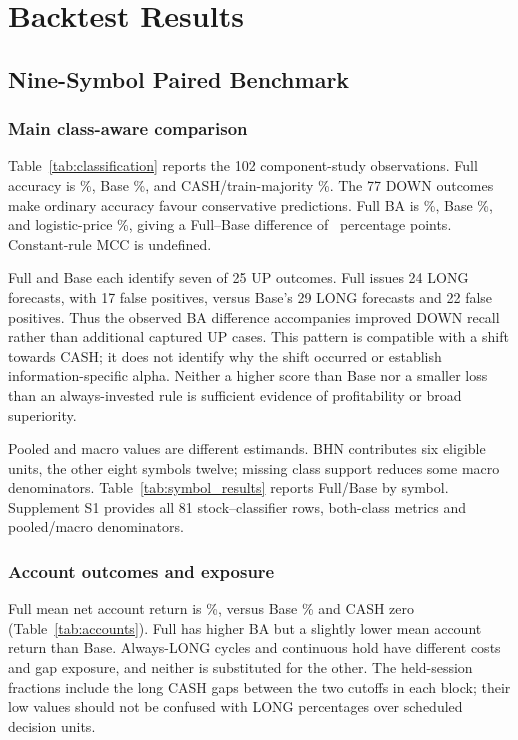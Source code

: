 \section{Backtest Results}
\label{sec:backtestresults}

\subsection{Nine-Symbol Paired Benchmark}
\subsubsection{Main class-aware comparison}
Table~\ref{tab:classification} reports the 102 component-study observations. Full accuracy is \FullAccuracy\%, Base \BaseAccuracy\%, and CASH/train-majority \CashAccuracy\%. The 77 DOWN outcomes make ordinary accuracy favour conservative predictions. Full BA is \FullBA\%, Base \BaseBA\%, and logistic-price \LogisticPriceBA\%, giving a Full--Base difference of \DeltaBA\ percentage points. Constant-rule MCC is undefined.

Full and Base each identify seven of 25 UP outcomes. Full issues 24 LONG forecasts, with 17 false positives, versus Base's 29 LONG forecasts and 22 false positives. Thus the observed BA difference accompanies improved DOWN recall rather than additional captured UP cases. This pattern is compatible with a shift towards CASH; it does not identify why the shift occurred or establish information-specific alpha. Neither a higher score than Base nor a smaller loss than an always-invested rule is sufficient evidence of profitability or broad superiority.

Pooled and macro values are different estimands. BHN contributes six eligible units, the other eight symbols twelve; missing class support reduces some macro denominators. Table~\ref{tab:symbol_results} reports Full/Base by symbol. Supplement S1 provides all 81 stock--classifier rows, both-class metrics and pooled/macro denominators.


\subsubsection{Account outcomes and exposure}
Full mean net account return is \FullReturn\%, versus Base \BaseReturn\% and CASH zero (Table~\ref{tab:accounts}). Full has higher BA but a slightly lower mean account return than Base. Always-LONG cycles and continuous hold have different costs and gap exposure, and neither is substituted for the other. The held-session fractions include the long CASH gaps between the two cutoffs in each block; their low values should not be confused with LONG percentages over scheduled decision units.

